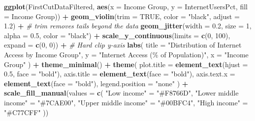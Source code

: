 \documentclass[
]{article}
\newenvironment{Shaded}{\begin{snugshade}}{\end{snugshade}}
\newcommand{\AttributeTok}[1]{\textcolor[rgb]{0.13,0.29,0.53}{#1}}
\newcommand{\CommentTok}[1]{\textcolor[rgb]{0.56,0.35,0.01}{\textit{#1}}}
\newcommand{\ConstantTok}[1]{\textcolor[rgb]{0.56,0.35,0.01}{#1}}
\newcommand{\DecValTok}[1]{\textcolor[rgb]{0.00,0.00,0.81}{#1}}
\newcommand{\FloatTok}[1]{\textcolor[rgb]{0.00,0.00,0.81}{#1}}
\newcommand{\FunctionTok}[1]{\textcolor[rgb]{0.13,0.29,0.53}{\textbf{#1}}}
\newcommand{\NormalTok}[1]{#1}
\newcommand{\OtherTok}[1]{\textcolor[rgb]{0.56,0.35,0.01}{#1}}
\newcommand{\SpecialCharTok}[1]{\textcolor[rgb]{0.81,0.36,0.00}{\textbf{#1}}}
\newcommand{\StringTok}[1]{\textcolor[rgb]{0.31,0.60,0.02}{#1}}
\begin{document}
\begin{Shaded}
\begin{Highlighting}[]
\FunctionTok{ggplot}\NormalTok{(FirstCutDataFiltered, }\FunctionTok{aes}\NormalTok{(}\AttributeTok{x =} \StringTok{\textasciigrave{}}\AttributeTok{Income Group}\StringTok{\textasciigrave{}}\NormalTok{, }\AttributeTok{y =}\NormalTok{ InternetUsersPct, }\AttributeTok{fill =} \StringTok{\textasciigrave{}}\AttributeTok{Income Group}\StringTok{\textasciigrave{}}\NormalTok{)) }\SpecialCharTok{+}
  \FunctionTok{geom\_violin}\NormalTok{(}\AttributeTok{trim =} \ConstantTok{TRUE}\NormalTok{, }\AttributeTok{color =} \StringTok{"black"}\NormalTok{, }\AttributeTok{adjust =} \FloatTok{1.2}\NormalTok{) }\SpecialCharTok{+}  \CommentTok{\# trim removes tails beyond the data}
  \FunctionTok{geom\_jitter}\NormalTok{(}\AttributeTok{width =} \FloatTok{0.2}\NormalTok{, }\AttributeTok{size =} \DecValTok{1}\NormalTok{, }\AttributeTok{alpha =} \FloatTok{0.5}\NormalTok{, }\AttributeTok{color =} \StringTok{"black"}\NormalTok{) }\SpecialCharTok{+}
  \FunctionTok{scale\_y\_continuous}\NormalTok{(}\AttributeTok{limits =} \FunctionTok{c}\NormalTok{(}\DecValTok{0}\NormalTok{, }\DecValTok{100}\NormalTok{), }\AttributeTok{expand =} \FunctionTok{c}\NormalTok{(}\DecValTok{0}\NormalTok{, }\DecValTok{0}\NormalTok{)) }\SpecialCharTok{+}  \CommentTok{\# Hard clip y{-}axis}
  \FunctionTok{labs}\NormalTok{(}
    \AttributeTok{title =} \StringTok{"Distribution of Internet Access by Income Group"}\NormalTok{,}
    \AttributeTok{y =} \StringTok{"Internet Access (\% of Population)"}\NormalTok{,}
    \AttributeTok{x =} \StringTok{"Income Group"}
\NormalTok{  ) }\SpecialCharTok{+}
  \FunctionTok{theme\_minimal}\NormalTok{() }\SpecialCharTok{+}
  \FunctionTok{theme}\NormalTok{(}
    \AttributeTok{plot.title =} \FunctionTok{element\_text}\NormalTok{(}\AttributeTok{hjust =} \FloatTok{0.5}\NormalTok{, }\AttributeTok{face =} \StringTok{"bold"}\NormalTok{),}
    \AttributeTok{axis.title =} \FunctionTok{element\_text}\NormalTok{(}\AttributeTok{face =} \StringTok{"bold"}\NormalTok{),}
    \AttributeTok{axis.text.x =} \FunctionTok{element\_text}\NormalTok{(}\AttributeTok{face =} \StringTok{"bold"}\NormalTok{),}
    \AttributeTok{legend.position =} \StringTok{"none"}
\NormalTok{  ) }\SpecialCharTok{+}
  \FunctionTok{scale\_fill\_manual}\NormalTok{(}\AttributeTok{values =} \FunctionTok{c}\NormalTok{(}
    \StringTok{"Low income"} \OtherTok{=} \StringTok{"\#F8766D"}\NormalTok{,}
    \StringTok{"Lower middle income"} \OtherTok{=} \StringTok{"\#7CAE00"}\NormalTok{,}
    \StringTok{"Upper middle income"} \OtherTok{=} \StringTok{"\#00BFC4"}\NormalTok{,}
    \StringTok{"High income"} \OtherTok{=} \StringTok{"\#C77CFF"}
\NormalTok{  ))}
\end{Highlighting}
\end{Shaded}
\end{document}
